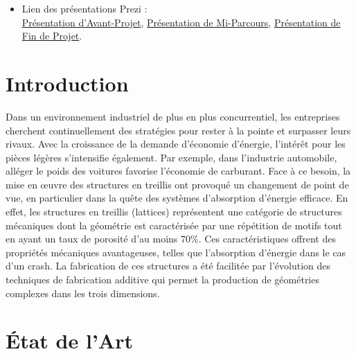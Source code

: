 \documentclass[a4paper]{article}
\begin{document}
\begin{itemize}
		\item Lien des présentations Prezi :\\
		\href{https://prezi.com/view/hybp9CbPGWiE2x6NsHw1/}{Présentation d'Avant-Projet}, \href{https://prezi.com/view/gkFmnRuL6RZhgo7aHoqH/}{Présentation de Mi-Parcours}, \href{https://prezi.com/view/dfuMaXqv6QFJHarNHnFO/}{Présentation de Fin de Projet}.
	\end{itemize}
	
	\newpage
	\renewcommand*\contentsname{Table des matières}
	\tableofcontents
	\newpage
	
	\newpage
	\renewcommand{\listfigurename}{Table des illustrations}
	\listoffigures
	\captionsetup{justification=centering}
	\newpage
	\renewcommand{\listtablename}{Liste des tableaux}
	\listoftables
	\captionsetup{justification=centering}
	\newpage
	
	\section{Introduction}
	\hspace{0.5cm}Dans un environnement industriel de plus en plus concurrentiel, les entreprises cherchent continuellement des stratégies pour rester à la pointe et surpasser leurs rivaux. Avec la croissance de la demande d’économie d’énergie, l'intérêt pour les pièces légères s'intensifie également. Par exemple, dans l'industrie automobile, alléger le poids des voitures favorise l'économie de carburant. Face à ce besoin, la mise en \oe uvre des structures en treillis ont provoqué un changement de point de vue, en particulier dans la quête des systèmes d'absorption d’énergie efficace. En effet, les structures en treillis (lattices) représentent une catégorie de structures mécaniques dont la géométrie est caractérisée par une répétition de motifs tout en ayant un taux de porosité d'au moins $70\%$. Ces caractéristiques offrent des propriétés mécaniques avantageuses, telles que l’absorption d’énergie dans le cas d’un crash. La fabrication de ces structures a été facilitée par l’évolution des techniques de fabrication additive qui permet la production de géométries complexes dans les trois dimensions.
	\newpage
	
	\section{État de l'Art}
\end{document}
